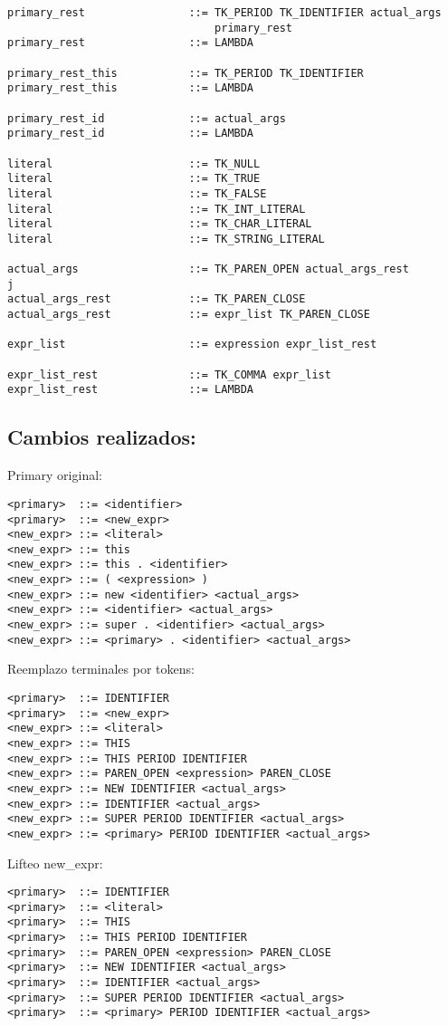 \documentclass [a4paper,titlepage]{report}
\begin{document}
\begin{verbatim}
primary_rest                ::= TK_PERIOD TK_IDENTIFIER actual_args 
                                primary_rest
primary_rest                ::= LAMBDA

primary_rest_this           ::= TK_PERIOD TK_IDENTIFIER
primary_rest_this           ::= LAMBDA

primary_rest_id             ::= actual_args
primary_rest_id             ::= LAMBDA

literal                     ::= TK_NULL
literal                     ::= TK_TRUE
literal                     ::= TK_FALSE
literal                     ::= TK_INT_LITERAL
literal                     ::= TK_CHAR_LITERAL
literal                     ::= TK_STRING_LITERAL

actual_args                 ::= TK_PAREN_OPEN actual_args_rest
j
actual_args_rest            ::= TK_PAREN_CLOSE
actual_args_rest            ::= expr_list TK_PAREN_CLOSE

expr_list                   ::= expression expr_list_rest

expr_list_rest              ::= TK_COMMA expr_list
expr_list_rest              ::= LAMBDA
\end{verbatim}

\subsection{Cambios realizados:}

Primary original:
\begin{verbatim}
<primary>  ::= <identifier>
<primary>  ::= <new_expr>
<new_expr> ::= <literal>
<new_expr> ::= this
<new_expr> ::= this . <identifier>
<new_expr> ::= ( <expression> )
<new_expr> ::= new <identifier> <actual_args>
<new_expr> ::= <identifier> <actual_args>
<new_expr> ::= super . <identifier> <actual_args>
<new_expr> ::= <primary> . <identifier> <actual_args>
\end{verbatim}

Reemplazo terminales por tokens:
\begin{verbatim}
<primary>  ::= IDENTIFIER
<primary>  ::= <new_expr>
<new_expr> ::= <literal>
<new_expr> ::= THIS
<new_expr> ::= THIS PERIOD IDENTIFIER
<new_expr> ::= PAREN_OPEN <expression> PAREN_CLOSE
<new_expr> ::= NEW IDENTIFIER <actual_args>
<new_expr> ::= IDENTIFIER <actual_args>
<new_expr> ::= SUPER PERIOD IDENTIFIER <actual_args>
<new_expr> ::= <primary> PERIOD IDENTIFIER <actual_args>
\end{verbatim}

Lifteo new\_expr:
\begin{verbatim}
<primary>  ::= IDENTIFIER
<primary>  ::= <literal>
<primary>  ::= THIS
<primary>  ::= THIS PERIOD IDENTIFIER
<primary>  ::= PAREN_OPEN <expression> PAREN_CLOSE
<primary>  ::= NEW IDENTIFIER <actual_args>
<primary>  ::= IDENTIFIER <actual_args>
<primary>  ::= SUPER PERIOD IDENTIFIER <actual_args>
<primary>  ::= <primary> PERIOD IDENTIFIER <actual_args>
\end{verbatim}
\end{document}
